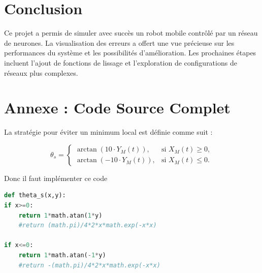 \documentclass{article}
\begin{document}
\section{Conclusion}
Ce projet a permis de simuler avec succès un robot mobile contrôlé par un réseau de neurones. La visualisation des erreurs a offert une vue précieuse sur les performances du système et les possibilités d'amélioration. Les prochaines étapes incluent l'ajout de fonctions de lissage et l'exploration de configurations de réseaux plus complexes.

\newpage
\appendix
\section{Annexe : Code Source Complet}








La stratégie pour éviter un minimum local est définie comme suit :

\[
\theta_s =
\begin{cases} 
\arctan(10 \cdot Y_M(t)), & \text{si } X_M(t) \geq 0, \\[10pt]
\arctan(-10 \cdot Y_M(t)), & \text{si } X_M(t) \leq 0.
\end{cases}
\]

Donc il faut implémenter ce code 

\begin{lstlisting}[language=Python, caption=Résolution du problème de propagation du gradient, label=listing:grad]
def theta_s(x,y):
if x>=0:
    return 1*math.atan(1*y)
    #return (math.pi)/4*2*x*math.exp(-x*x)

if x<=0:
    return 1*math.atan(-1*y)
    #return -(math.pi)/4*2*x*math.exp(-x*x)
\end{lstlisting}
\end{document}
